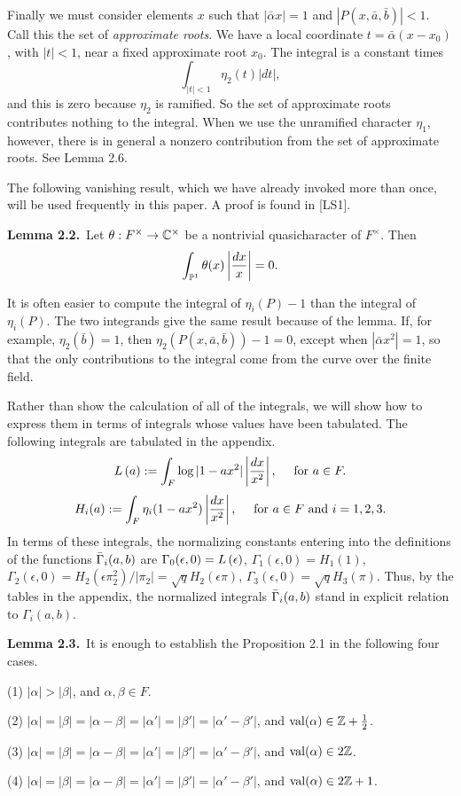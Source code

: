 Finally we must consider elements $x$
such that $|\bar \alpha x| = 1$ and $|P(x,\bar a,\bar b)|<1$.
Call this the set of {\it approximate roots}.
We have a local coordinate $t = \bar \alpha(x-x_0)$, with $|t|<1$,
near a fixed approximate root $x_0$.  The integral is a constant times
$$\int_{|t|<1} \eta_2(t)|dt|,$$
and this is zero because $\eta_2$ is ramified.  So the set of
approximate roots contributes nothing to the integral.  When
we use the unramified character $\eta_1$, however, there is in
general a nonzero contribution from the set of approximate roots.
See Lemma 2.6.

The following vanishing result, which we have already invoked
more than once, will be used frequently in this paper.  A proof
is found in [LS1].

\bigskip
\noindent
{\bf Lemma 2.2.}\ Let $\theta:F^\times\to \C^\times$ be a
nontrivial quasicharacter of $F^\times$.  Then
$$\int_{\P^1} \theta(x) \left | {dx\over x}\right | =0.$$

It is often easier to compute the integral of $\eta_i(P) - 1$ 
than the integral of $\eta_i(P)$.  The two integrands give the
same result because of the lemma.
If, for example, $\eta_2(\bar b) = 1$, then $\eta_2(P(x,\bar a,\bar b))-1=0$,
except when $|\bar\alpha x^2|=1$, so that the only contributions to the
integral come from the curve over the finite field.

Rather than show the calculation of all of the integrals, we will
show how to express them in terms of integrals whose values
have been tabulated.
The following integrals are tabulated in the appendix.
$$\LOG(a) := \int_{F} \log|1-ax^2| \leftdx,
\quad \hbox{ for } a\in F.$$
$$H_i(a):= \int_{F}\eta_i(1-ax^2) \leftdx,
\quad \hbox{ for } a\in F \hbox{ and } i=1,2,3.$$
In terms of these integrals, the normalizing constants
entering into the definitions of the functions $\bGamma_i(a,b)$
are
$\Gamma_0(\epsilon,0) = \LOG(\epsilon)$, $\Gamma_1(\epsilon,0) = H_1(1)$,
$\Gamma_2(\epsilon,0) = H_2(\epsilon \pi_2^2)/|\pi_2| = \sqrt{q}H_2(\epsilon\pi)$,
$\Gamma_3(\epsilon,0) = \sqrt{q} H_3(\pi)$.  
Thus, by the tables in the appendix,
the normalized integrals $\bGamma_i(a,b)$ stand in explicit relation
to $\Gamma_i(a,b)$.

\bigskip
\noindent
{
{\bf Lemma 2.3.}\  It is enough to establish the Proposition 2.1 
in the following
four cases.  \parskip=0pt \parindent=0pt

(1) $|\alpha|>|\beta|$, and $\alpha,\beta\in F$.

(2) $|\alpha|=|\beta| = |\alpha-\beta|=|\alpha'|=|\beta'|=|\alpha'-\beta'|$,
and $\val(\alpha)\in {\Bbb Z} + {1\over 2}$.

(3) $|\alpha|=|\beta| = |\alpha-\beta|=|\alpha'|=|\beta'|=|\alpha'-\beta'|$,
and $\val(\alpha)\in 2{\Bbb Z}$.

(4) $|\alpha|=|\beta| = |\alpha-\beta|=|\alpha'|=|\beta'|=|\alpha'-\beta'|$,
and $\val(\alpha)\in 2{\Bbb Z}+1$.
}

